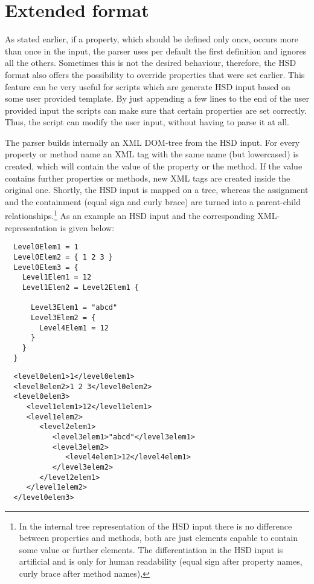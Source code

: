 \section{Extended format}
\label{sec:hsdext}

As stated earlier, if a property, which should be defined only once,
occurs more than once in the input, the parser uses per default the
first definition and ignores all the others. Sometimes this is not the
desired behaviour, therefore, the HSD format also offers the
possibility to override properties that were set earlier.  This
feature can be very useful for scripts which are generate HSD input
based on some user provided template.  By just appending a few lines
to the end of the user provided input the scripts can make sure that
certain properties are set correctly. Thus, the script can modify the
user input, without having to parse it at all.

The parser builds internally an XML DOM-tree from the HSD input. For
every property or method name an XML tag with the same name (but
lowercased) is created, which will contain the value of the property
or the method. If the value contains further properties or methods,
new XML tags are created inside the original one. Shortly, the HSD
input is mapped on a tree, whereas the assignment and the containment
(equal sign and curly brace) are turned into a parent-child
relationships.\footnote{In the internal tree representation of the HSD
  input there is no difference between properties and methods, both
  are just elements capable to contain some value or further
  elements. The differentiation in the HSD input is artificial and is
  only for human readability (equal sign after property names, curly
  brace after method names),} As an example an HSD input and the
corresponding XML-representation is given below:

\begin{minipage}{1.0\linewidth}
  \begin{center}
    \begin{minipage}[t]{5.5cm}
\begin{verbatim}
  Level0Elem1 = 1
  Level0Elem2 = { 1 2 3 }
  Level0Elem3 = {
    Level1Elem1 = 12
    Level1Elem2 = Level2Elem1 {

      Level3Elem1 = "abcd"
      Level3Elem2 = {
        Level4Elem1 = 12
      }
    }
  }
\end{verbatim}
    \end{minipage}
    \hspace*{1cm}
    \begin{minipage}[t]{7.5cm}
\begin{verbatim}
  <level0elem1>1</level0elem1>
  <level0elem2>1 2 3</level0elem2>
  <level0elem3>
     <level1elem1>12</level1elem1>
     <level1elem2>
        <level2elem1>
           <level3elem1>"abcd"</level3elem1>
           <level3elem2>
              <level4elem1>12</level4elem1>
           </level3elem2>
        </level2elem1>
     </level1elem2>
  </level0elem3>
\end{verbatim}
    \end{minipage}
  \end{center}
\end{minipage}

